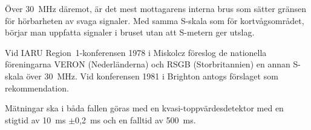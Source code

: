 Över \SI{30}{\mega\hertz} däremot, är det mest mottagarens interna brus som
sätter gränsen för hörbarheten av svaga signaler.
Med samma S-skala som för kortvågsområdet, börjar man uppfatta signaler i
bruset utan att S-metern ger utslag.

Vid IARU Region~1-konferensen 1978 i Miskolcz föreslog de nationella
föreningarna VERON (Nederländerna) och RSGB (Storbritannien) en annan
S-skala över \SI{30}{\mega\hertz}.
Vid konferensen 1981 i Brighton antogs förslaget som rekommendation.

Mätningar ska i båda fallen göras med en kvasi-toppvärdesdetektor
med en stigtid av 10~ms \(\pm\)0,2~ms och en falltid av \SI{500}{\milli\second}.

